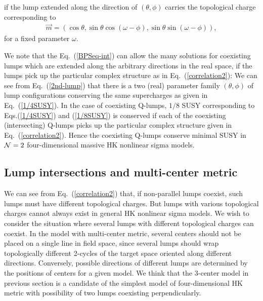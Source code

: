 \documentclass[a4paper,12pt]{article}
\begin{document}
if the lump extended along the direction of $(\theta, \phi)$   
carries the topological charge corresponding to 
\begin{eqnarray}
\vec{m}=(\cos\theta, \sin\theta\cos(\omega-\phi), \sin\theta\sin(\omega-\phi)),
\label{correlation2}
\end{eqnarray} 
for a fixed parameter $\omega$.

We note that the Eq.~(\ref{BPSeq-int}) can allow the many solutions for 
coexisting lumps which are extended along the arbitrary directions 
in the real space, if the lumps pick up the particular complex structure 
as in Eq.~(\ref{correlation2}):
We can see from Eq.~(\ref{2nd-lump}) that there is a two (real) parameter 
family $(\theta, \phi)$ of lump 
configurations conserving the same supercharges 
as given in Eq.~(\ref{1/4SUSY}). 
In the case of coexisting Q-lumps, 
$1/8$ SUSY corresponding to Eqs.(\ref{1/4SUSY}) and (\ref{1/8SUSY})
is conserved if each of the coexisting (intersecting) Q-lumps picks up the 
particular complex structure given in Eq.~(\ref{correlation2}). 
Hence the coexisting Q-lumps conserve minimal SUSY 
in ${\cal N}=2$ four-dimensional massive HK nonlinear sigma models. 

\subsection{Lump intersections and multi-center metric}
We can see from Eq.~(\ref{correlation2}) that, if non-parallel lumps 
coexist, such lumps must have 
different topological charges. 
But lumps with various topological charges cannot always exist in 
general HK nonlinear sigma models. 
We wish to consider the situation where several lumps with different 
topological charges can coexist. 
In the model with multi-center metric, several centers 
should not be placed on a single line 
in field space, since several lumps should wrap topologically 
different 2-cycles of the target space 
oriented along different directions. 
Conversely, 
possible directions of different lumps are determined by the positions 
of centers for a given model. 
We think that the 3-center model in previous section is a candidate 
of the simplest model of four-dimensional HK metric 
with possibility of two lumps coexisting 
perpendicularly.
\end{document}
